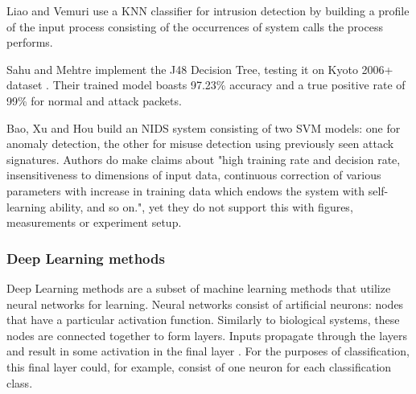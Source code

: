 Liao and Vemuri \cite{knn_2002} use a KNN classifier for intrusion detection by building a profile of the input process consisting of the occurrences of system calls the process performs.

Sahu and Mehtre \cite{j48_dt} implement the J48 Decision Tree, testing it on Kyoto 2006+ dataset \cite{kyoto}. Their trained model boasts 97.23\% accuracy and a true positive rate of 99\% for normal and attack packets.  

Bao, Xu and Hou \cite{nids_svm} build an NIDS system consisting of two SVM models: one for anomaly detection, the other for misuse detection using previously seen attack signatures. Authors do make claims about "high training rate and decision rate, insensitiveness to dimensions of input data, continuous correction of various parameters with increase in training data which endows the system with self-learning ability, and so on.", yet they do not support this with figures, measurements or experiment setup. 

\subsubsection{Deep Learning methods}

Deep Learning methods are a subset of machine learning methods that utilize neural networks for learning. Neural networks consist of artificial neurons: nodes that have a particular activation function. Similarly to biological systems, these nodes are connected together to form layers. Inputs propagate through the layers and result in some activation in the final layer \cite{neural_networks}. For the purposes of classification, this final layer could, for example, consist of one neuron for each classification class.

